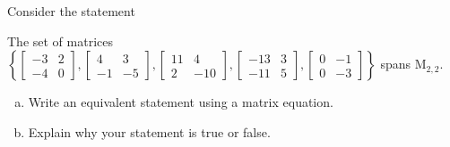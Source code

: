 
\begin{exerciseStatement}


Consider the statement 
\begin{center}\begin{minipage}{0.8\textwidth}
 The set of matrices \( \left\{ \left[\begin{array}{cc}
-3 & 2 \\
-4 & 0
\end{array}\right] , \left[\begin{array}{cc}
4 & 3 \\
-1 & -5
\end{array}\right] , \left[\begin{array}{cc}
11 & 4 \\
2 & -10
\end{array}\right] , \left[\begin{array}{cc}
-13 & 3 \\
-11 & 5
\end{array}\right] , \left[\begin{array}{cc}
0 & -1 \\
0 & -3
\end{array}\right] \right\} \) spans \(\mathrm{M}_{2,2}\). 
\end{minipage}\end{center}
    


\begin{enumerate}[(a)]
\item  Write an equivalent statement using a matrix equation.
\item  Explain why your statement is true or false.
\end{enumerate}
    
\end{exerciseStatement}
    
